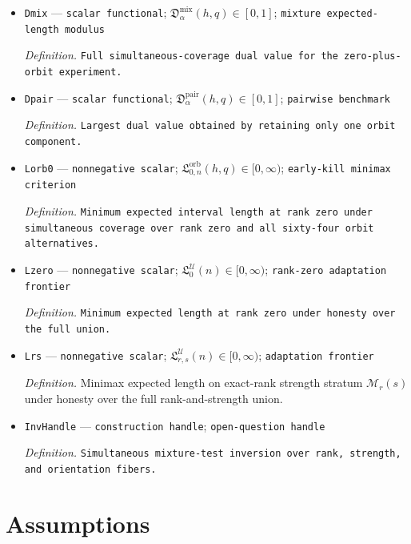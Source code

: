 \documentclass{article}
\begin{document}
\begin{itemize}
  \par\smallskip\noindent\emph{Definition.} \texttt{Dual weights on the simultaneous alternative-\allowbreak{}coverage constraints.}
  \item \texttt{Dmix} --- \texttt{scalar functional}; \(\mathfrak D_{\alpha}^{\mathrm{mix}}(h,q)\in[0,1]\); \texttt{mixture expected-\allowbreak{}length modulus}
  \par\smallskip\noindent\emph{Definition.} \texttt{Full simultaneous-\allowbreak{}coverage dual value for the zero-\allowbreak{}plus-\allowbreak{}orbit experiment.}
  \item \texttt{Dpair} --- \texttt{scalar functional}; \(\mathfrak D_{\alpha}^{\mathrm{pair}}(h,q)\in[0,1]\); \texttt{pairwise benchmark}
  \par\smallskip\noindent\emph{Definition.} \texttt{Largest dual value obtained by retaining only one orbit component.}
  \item \texttt{Lorb0} --- \texttt{nonnegative scalar}; \(\mathfrak L_{0,n}^{\mathrm{orb}}(h,q)\in[0,\infty)\); \texttt{early-\allowbreak{}kill minimax criterion}
  \par\smallskip\noindent\emph{Definition.} \texttt{Minimum expected interval length at rank zero under simultaneous coverage over rank zero and all sixty-\allowbreak{}four orbit alternatives.}
  \item \texttt{Lzero} --- \texttt{nonnegative scalar}; \(\mathfrak L_{0}^{\mathcal U}(n)\in[0,\infty)\); \texttt{rank-\allowbreak{}zero adaptation frontier}
  \par\smallskip\noindent\emph{Definition.} \texttt{Minimum expected length at rank zero under honesty over the full union.}
  \item \texttt{Lrs} --- \texttt{nonnegative scalar}; \(\mathfrak L_{r,s}^{\mathcal U}(n)\in[0,\infty)\); \texttt{adaptation frontier}
  \par\smallskip\noindent\emph{Definition.} Minimax expected length on exact-rank strength stratum \(\mathcal M_r(s)\) under honesty over the full rank-and-strength union.
  \item \texttt{InvHandle} --- \texttt{construction handle}; \texttt{open-\allowbreak{}question handle}
  \par\smallskip\noindent\emph{Definition.} \texttt{Simultaneous mixture-\allowbreak{}test inversion over rank,\allowbreak{} strength,\allowbreak{} and orientation fibers.}
\end{itemize}

\section{Assumptions}
\end{document}
